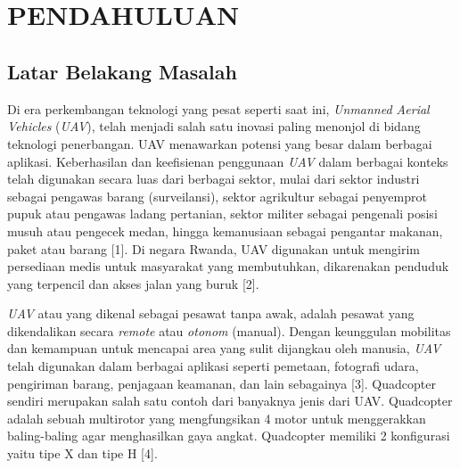 
\chapter[PENDAHULUAN]{\\ PENDAHULUAN}

\section{Latar Belakang Masalah}

Di era perkembangan teknologi yang pesat seperti saat ini, \textit{Unmanned Aerial Vehicles} (\textit{UAV}), telah menjadi salah satu inovasi paling menonjol di bidang teknologi penerbangan. UAV menawarkan potensi yang besar dalam berbagai aplikasi. Keberhasilan dan keefisienan penggunaan \textit{UAV} dalam berbagai konteks telah digunakan secara luas dari berbagai sektor, mulai dari sektor industri sebagai pengawas barang (surveilansi), sektor agrikultur sebagai penyemprot pupuk atau pengawas ladang pertanian, sektor militer sebagai pengenali posisi musuh atau pengecek medan, hingga kemanusiaan sebagai pengantar makanan, paket atau barang [1]. Di negara Rwanda, UAV digunakan untuk mengirim persediaan medis untuk masyarakat yang membutuhkan, dikarenakan penduduk yang terpencil dan akses jalan yang buruk [2].

\textit{UAV} atau yang dikenal sebagai pesawat tanpa awak, adalah pesawat yang dikendalikan secara \textit{remote} atau \textit{otonom} (manual). Dengan keunggulan mobilitas dan kemampuan untuk mencapai area yang sulit dijangkau oleh manusia, \textit{UAV} telah digunakan dalam berbagai aplikasi seperti pemetaan, fotografi udara, pengiriman barang, penjagaan keamanan, dan lain sebagainya [3]. Quadcopter sendiri merupakan salah satu contoh dari banyaknya jenis dari UAV. Quadcopter adalah sebuah multirotor yang mengfungsikan 4 motor untuk menggerakkan baling-baling agar menghasilkan gaya angkat. Quadcopter memiliki 2 konfigurasi yaitu tipe X dan tipe H [4]. 

